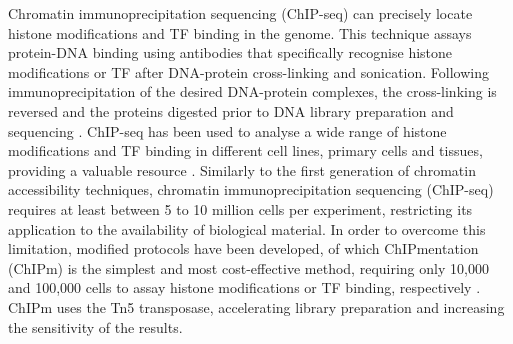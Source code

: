 Chromatin immunoprecipitation sequencing (ChIP-seq) can precisely locate histone modifications and TF binding in the genome. This technique assays protein-DNA binding using antibodies that specifically recognise histone modifications or TF after DNA-protein cross-linking and sonication. Following immunoprecipitation of the desired DNA-protein complexes, the cross-linking is reversed and the proteins digested prior to DNA library preparation and sequencing \parencite{Solomon1988,Barski2007,Johnson2007}. ChIP-seq has been used to analyse a wide range of histone modifications and TF binding in different cell lines, primary cells and tissues, providing a valuable resource \parencite{ENCODE2007,Bernstein2010,Adams2012}. Similarly to the first generation of chromatin accessibility techniques, chromatin immunoprecipitation sequencing (ChIP-seq) requires at least between 5 to 10 million cells per experiment, restricting its application to the availability of biological material. In order to overcome this limitation, modified protocols have been developed, of which ChIPmentation (ChIPm) is the simplest and most cost-effective method, requiring only 10,000 and 100,000 cells to assay histone modifications or TF binding, respectively \parencite{Schmidl2015}. ChIPm uses the Tn5 transposase, accelerating library preparation and increasing the sensitivity of the results. 


